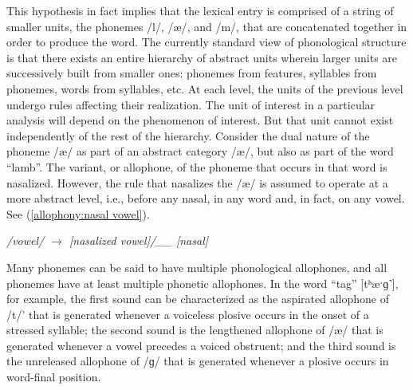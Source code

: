 This hypothesis in fact implies that the lexical entry is comprised
of a string of smaller units, the phonemes {/l/}, {/æ/},
and {/m/}, that are concatenated together in order to produce
the word. The currently standard view of phonological structure is
that there exists an entire hierarchy of abstract units wherein larger
units are successively built from smaller ones: phonemes from features,
syllables from phonemes, words from syllables, etc. At each level,
the units of the previous level undergo rules affecting their realization.
The unit of interest in a particular analysis will depend on the phenomenon
of interest. But that unit cannot exist independently of the rest
of the hierarchy. Consider the dual nature of the phoneme {/æ/}
as part of an abstract category {/æ/}, but also as part
of the word “lamb”. The variant, or allophone, of the phoneme
that occurs in that word is nasalized. However, the rule that nasalizes
the {/æ/} is assumed to operate at a more abstract level,
i.e., before any nasal, in any word and, in fact, on any
vowel. See (\ref{allophony:nasal vowel}). 
\begin{covexample}
\emph{\label{allophony:nasal vowel}/vowel/ $\rightarrow$ {[}nasalized
vowel{]}/\_\_ {[}nasal{]}}
\end{covexample}
Many phonemes can be said to have multiple phonological allophones,
and all phonemes have at least multiple phonetic allophones. In the
word “tag” {[tʰæˑɡ˺}{]}, for example, the first
sound can be characterized as the aspirated allophone of {/t/}'
that is generated whenever a voiceless plosive occurs in the onset
of a stressed syllable; the second sound is the lengthened allophone
of {/æ/} that is generated whenever a vowel precedes a voiced
obstruent; and the third sound is the unreleased allophone of {/ɡ/}
that is generated whenever a plosive occurs in word-final position. 

